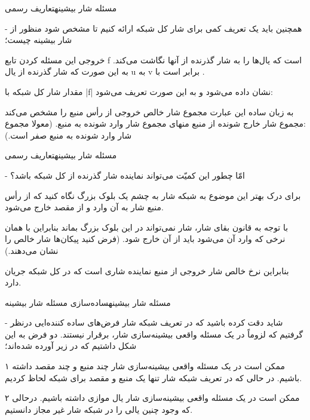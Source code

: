 \begin{itemframe}{مسئله شار بیشینه}{تعاریف رسمی}

\item[-]
همچنین باید یک تعریف کمی برای شار کل شبکه ارائه کنیم تا مشخص شود منظور از شار بیشینه چیست؛
\item
خروجی این مسئله کردن تابع f است که یال‌ها را به شار گذرنده از آنها نگاشت می‌کند. به این صورت که شار گذرنده از یال u به v برابر است با
 .

\item
مقدار شار کل شبکه با |f| نشان داده می‌شود و به این صورت تعریف می‌شود: \\
\begin{center}
\end{center}
\item
به زبان ساده این عبارت مجموع شار خالص خروجی از رأس منبع را مشخص می‌کند :مجموع شار خارج شونده از منبع منهای مجموع شار وارد شونده به منبع. (معولا مجموع شار وارد شونده به منبع صفر است.)
\end{itemframe}
\begin{itemframe}{مسئله شار بیشینه}{تعاریف رسمی}
\item[-]
امّا چطور این کمیّت می‌تواند نماینده شار گذرنده از کل شبکه باشد؟
\item
برای درک بهتر این موضوع به شبکه شار به چشم یک بلوک بزرگ نگاه کنید که از رأس منبع شار به آن وارد و از مقصد خارج می‌شود.

\item
با توجه به قانون بقای شار، شار نمی‌تواند در این بلوک بزرگ بماند بنابراین با همان نرخی که وارد آن می‌شود باید از آن خارج شود. (فرض کنید پیکان‌ها شار خالص را نشان می‌دهند.)‌
\item
بنابراین نرخ خالص شار خروجی از منبع نماینده شاری است که در کل شبکه جریان دارد.
\end{itemframe}


\begin{itemframe}{مسئله شار بیشینه}{ساده‌سازی مسئله شار بیشینه}
\item[-]
شاید دقت کرده باشید که در تعریف شبکه شار فرض‌های ساده کننده‌ایی درنظر گرفتیم که لزوماً در یک مسئله واقعی بیشینه‌سازی شار، برقرار نیستند. دو فرض به این شکل داشتیم که در زیر آورده شده‌اند؛
\item[۱]
ممکن است در یک مسئله واقعی بیشینه‌سازی شار چند منبع و چند مقصد داشته باشیم. در حالی که در تعریف شبکه شار تنها یک منبع و مقصد برای شبکه لحاظ کردیم.
\item[۲]
ممکن است در یک مسئله واقعی بیشینه‌سازی شار یال موازی داشته باشیم. درحالی که وجود چنین یالی را در شبکه شار غیر مجاز دانستیم.
\end{itemframe}

